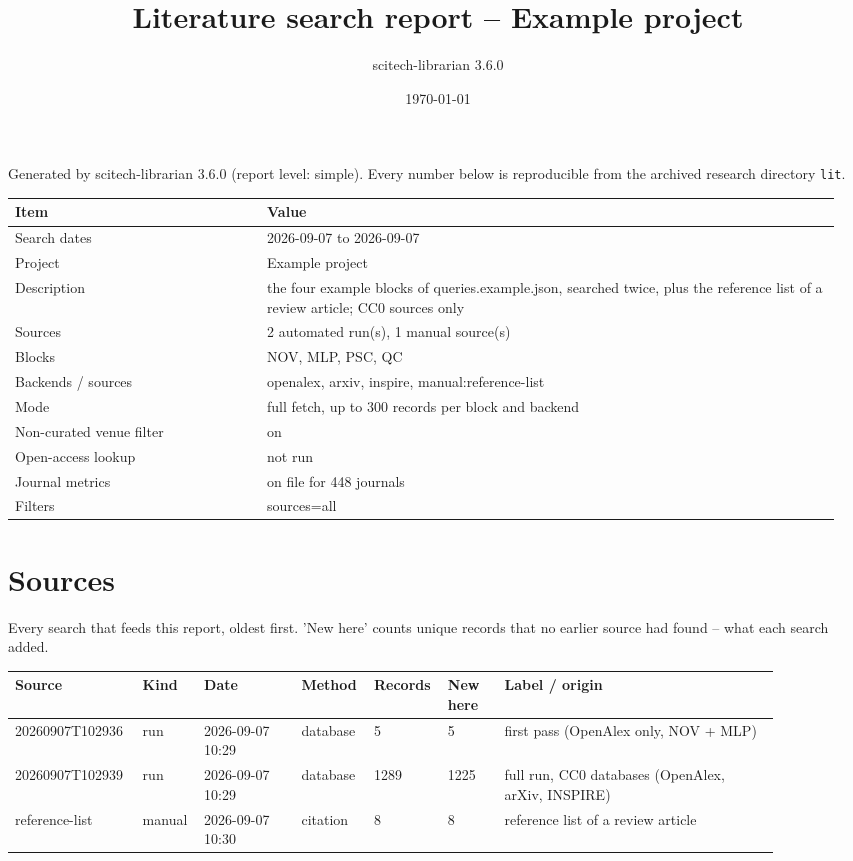 \documentclass[10pt,a4paper]{article}
\title{Literature search report -- Example project}\author{scitech-librarian 3.6.0}\date{\today}
\begin{document}
\maketitle
Generated by scitech-librarian 3.6.0 (report level: simple). Every number below is reproducible from the archived research directory \texttt{lit}.

{\scriptsize\begin{longtable}{p{0.291\linewidth}p{0.664\linewidth}}
\hline
\textbf{Item} & \textbf{Value} \\ \hline
\endhead
Search dates & 2026-09-07 to 2026-09-07 \\
Project & Example project \\
Description & the four example blocks of queries.example.json, searched twice, plus the reference list of a review article; CC0 sources only \\
Sources & 2 automated run(s), 1 manual source(s) \\
Blocks & NOV, MLP, PSC, QC \\
Backends / sources & openalex, arxiv, inspire, manual:reference-list \\
Mode & full fetch, up to 300 records per block and backend \\
Non-curated venue filter & on \\
Open-access lookup & not run \\
Journal metrics & on file for 448 journals \\
Filters & sources=all \\
\hline
\end{longtable}}
\section*{Sources}
Every search that feeds this report, oldest first. 'New here' counts unique records that no earlier source had found -- what each search added.

{\scriptsize\begin{longtable}{p{0.123\linewidth}p{0.065\linewidth}p{0.129\linewidth}p{0.078\linewidth}p{0.071\linewidth}p{0.078\linewidth}p{0.349\linewidth}}
\hline
\textbf{Source} & \textbf{Kind} & \textbf{Date} & \textbf{Method} & \textbf{Records} & \textbf{New here} & \textbf{Label / origin} \\ \hline
\endhead
20260907T102936 & run & 2026-09-07 10:29 & database & 5 & 5 & first pass (OpenAlex only, NOV + MLP) \\
20260907T102939 & run & 2026-09-07 10:29 & database & 1289 & 1225 & full run, CC0 databases (OpenAlex, arXiv, INSPIRE) \\
reference-list & manual & 2026-09-07 10:30 & citation & 8 & 8 & reference list of a review article \\
\hline
\end{longtable}}
\end{document}
